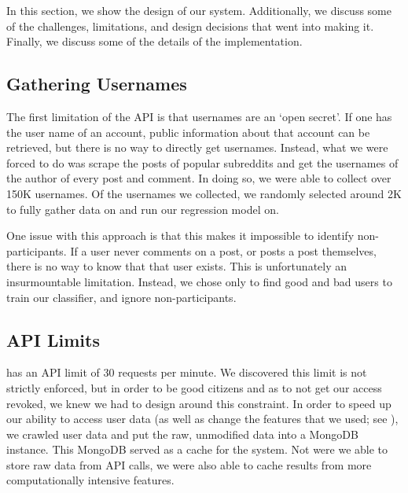 In this section, we show the design of our system. Additionally, we discuss some
of the challenges, limitations, and design decisions that went into making it.
Finally, we discuss some of the details of the implementation.

\subsection{Gathering \reddit{} Usernames} %
\label{sub:gathering_reddit_usernames}

The first limitation of the \reddit{} API is that usernames are an `open
secret'. If one has the user name of an account, public information about that
account can be retrieved, but there is no way to directly get usernames.
Instead, what we were forced to do was scrape the posts of popular subreddits
and get the usernames of the author of every post and comment. In doing so, we
were able to collect over 150K usernames. Of the usernames we collected, we
randomly selected around 2K to fully gather data on and run our regression model
on.

One issue with this approach is that this makes it impossible to identify non-
participants. If a user never comments on a post, or posts a post themselves,
there is no way to know that that user exists. This is unfortunately an
insurmountable limitation. Instead, we chose only to find good and bad users to
train our classifier, and ignore non-participants.


\subsection{\reddit{} API Limits} %
\label{sub:reddit_api_limits}

\reddit{} has an API limit of 30 requests per minute. We discovered this limit
is not strictly enforced, but in order to be good citizens and as to not get our
access revoked, we knew we had to design around this constraint. In order to
speed up our ability to access user data (as well as change the features that we
used; see ), we crawled user data and put the
raw, unmodified data into a MongoDB instance. This MongoDB served as a cache for
the system. Not were we able to store raw data from \reddit{} API calls, we were
also able to cache results from more computationally intensive features.


